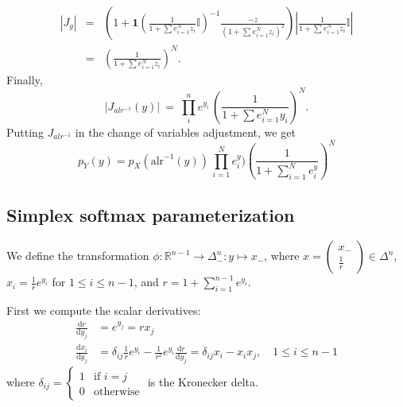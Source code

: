 \documentclass[11pt]{article}
\newcommand{\abs}[1]{\left| #1 \right|}
\newcommand{\absdet}[1]{\abs{#1}}
\begin{document}
\begin{eqnarray*}
  |J_{g}|
  & = &
  \left(
    1
    + \mathbf{1}
    \left(\frac{1}{1 + \sum e_{i=1}^{N} z_i} \mathbb{I} \right)^{-1}
    \frac{-z}{(1 + \sum e_{i=1}^{N} z_i)^2}
    \right)
    \abs{\frac{1}{1 + \sum e_{i=1}^{N} z_i} \mathbb{I}}
  \\[6pt]
  
  & = & \left( \frac{1}{1 + \sum e_{i=1}^{N} z_i} \right)^N.
\end{eqnarray*} 
Finally,
\[
  \absdet{J_{alr^{-1}}(y)}
  \ = \
 \prod_i^n e^{y_i}
  \, \left( \frac{1}{1 + \sum e_{i=1}^{N}y_i} \right)^N.
\]
Putting $J_{alr^{-1}}$ in the change of variables adjustment, we get
\[
  p_Y(y)
  = p_X(\textrm{alr}^{-1}(y))
  \, \prod_{i=1}^{N} e^y_i)
  \left( \frac{1}{1 + \sum_{i=1}^{N} e^y_i}\right)^N
\]  

%


\subsection{Simplex softmax parameterization}

We define the transformation
$\phi: \mathbb{R}^{n-1} \to \Delta^n_-: y \mapsto x_-$, where
$x=\begin{pmatrix}x_- \\ \frac{1}{r}\end{pmatrix} \in \Delta^n$,
$x_i = \frac{1}{r} e^{y_i}$ for $1 \le i \le n-1$, and
$r = 1 + \sum_{i=1}^{n-1} e^{y_i}$.

First we compute the scalar derivatives:
\[
\begin{aligned}
  \frac{\mathrm{d} r}{\mathrm{d} y_j}
  &= e^{y_j} = r x_j\\
  \frac{\mathrm{d} x_i}{\mathrm{d} y_j}
  &= \delta_{ij} \frac{1}{r} e^{y_i} - \frac{1}{r^2} e^{y_i}
  \frac{\mathrm{d} r}{\mathrm{d} y_j}
  = \delta_{ij} x_i - x_i x_j, \quad 1 \le i \le n-1
\end{aligned}
\]
where
$\delta_{ij} = \begin{cases} 1 &\text{if } i = j \\ 0
  &\text{otherwise}\end{cases}$ is the Kronecker delta.
\end{document}
